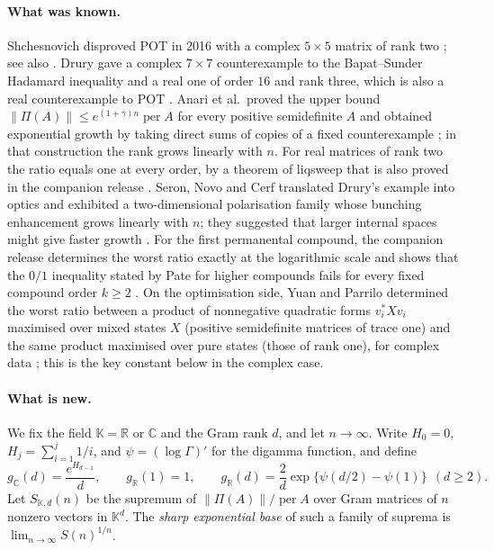 \documentclass[11pt,a4paper]{article}
\theoremstyle{remark}
\newcommand{\per}{\operatorname{per}}
\newcommand{\norm}[1]{\left\lVert#1\right\rVert}
\newcommand{\C}{\mathbb C}
\newcommand{\R}{\mathbb R}
\newcommand{\K}{\mathbb K}
\begin{document}
\paragraph{What was known.}
Shchesnovich disproved POT in 2016 with a complex $5\times5$ matrix of rank two \cite{Shch}; see also \cite{Anh,Zhang16}. Drury gave a complex $7\times 7$ counterexample to the Bapat--Sunder Hadamard inequality \cite{Drury16} and a real one of order $16$ and rank three, which is also a real counterexample to POT \cite{Drury17}. Anari et al.\ proved the upper bound $\norm{\Pi(A)}\le e^{(1+\gamma)n}\per A$ for every positive semidefinite $A$ and obtained exponential growth by taking direct sums of copies of a fixed counterexample \cite[Theorem~2 and Claim~1]{AGGS}; in that construction the rank grows linearly with $n$. For real matrices of rank two the ratio equals one at every order, by a theorem of liqsweep \cite{Liq} that is also proved in the companion release \cite[Appendix~A]{EPBS}. Seron, Novo and Cerf translated Drury's example into optics and exhibited a two-dimensional polarisation family whose bunching enhancement grows linearly with $n$; they suggested that larger internal spaces might give faster growth \cite{SNC}. For the first permanental compound, the companion release determines the worst ratio exactly at the logarithmic scale and shows that the $0/1$ inequality stated by Pate for higher compounds fails for every fixed compound order $k\ge2$ \cite{EPBS}. On the optimisation side, Yuan and Parrilo determined the worst ratio between a product of nonnegative quadratic forms $v_i^*Xv_i$ maximised over mixed states $X$ (positive semidefinite matrices of trace one) and the same product maximised over pure states (those of rank one), for complex data \cite{YP2}; this is the key constant below in the complex case.

\paragraph{What is new.}
We fix the field $\K=\R$ or $\C$ and the Gram rank $d$, and let $n\to\infty$. Write $H_0=0$, $H_j=\sum_{i=1}^j 1/i$, and $\psi=(\log\Gamma)'$ for the digamma function, and define
\[
 g_\C(d)=\frac{e^{H_{d-1}}}{d},\qquad g_\R(1)=1,\qquad g_\R(d)=\frac2d\exp\{\psi(d/2)-\psi(1)\}\ \ (d\ge2).
\]
Let $S_{\K,d}(n)$ be the supremum of $\norm{\Pi(A)}/\per A$ over Gram matrices of $n$ nonzero vectors in $\K^d$. The \emph{sharp exponential base} of such a family of suprema is $\lim_{n\to\infty}S(n)^{1/n}$.
\end{document}
